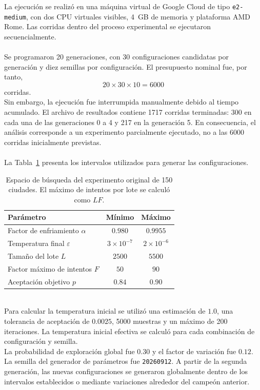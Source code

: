 \documentclass[12pt]{article}
\begin{document}
La ejecución se realizó en una máquina virtual de Google Cloud de tipo \texttt{e2-medium}, con dos CPU virtuales visibles, 4~GB de memoria y plataforma AMD Rome. Las corridas dentro del proceso experimental se
ejecutaron secuencialmente.
\\\\
Se programaron 20 generaciones, con 30 configuraciones candidatas por
generación y diez semillas por configuración. El presupuesto nominal
fue, por tanto,
\[
    20 \times 30 \times 10 = 6000
\]
corridas.
\\
Sin embargo, la ejecución fue interrumpida manualmente debido al tiempo
acumulado. El archivo de resultados contiene 1717 corridas terminadas:
300 en cada una de las generaciones 0 a 4 y 217 en la generación 5.
En consecuencia, el análisis corresponde a un experimento parcialmente
ejecutado, no a las 6000 corridas inicialmente previstas.
\\\\
La Tabla~\ref{tab:diseno150-rangos} presenta los intervalos utilizados
para generar las configuraciones.
\begin{table}[htbp]
    \centering
    \small
    \begin{tabular}{lcc}
        \hline
        Parámetro & Mínimo & Máximo \\
        \hline
        Factor de enfriamiento $\alpha$
            & $0.980$ & $0.9955$ \\
        Temperatura final $\varepsilon$
            & $3\times10^{-7}$ & $2\times10^{-6}$ \\
        Tamaño del lote $L$
            & $2500$ & $5500$ \\
        Factor máximo de intentos $F$
            & $50$ & $90$ \\
        Aceptación objetivo $p$
            & $0.84$ & $0.90$ \\
        \hline
    \end{tabular}
    \caption{Espacio de búsqueda del experimento original
    de 150 ciudades. El máximo de intentos por lote se calculó
    como $L F$.}
    \label{tab:diseno150-rangos}
\end{table}
\\
Para calcular la temperatura inicial se utilizó una estimación de
$1.0$, una tolerancia de aceptación de $0.0025$, 5000 muestras y
un máximo de 200 iteraciones. La temperatura inicial efectiva se
calculó para cada combinación de configuración y semilla.
\\
La probabilidad de exploración global fue $0.30$ y el factor de
variación fue $0.12$. La semilla del generador de parámetros fue
\texttt{20260912}. A partir de la segunda generación, las nuevas
configuraciones se generaron globalmente dentro de los intervalos
establecidos o mediante variaciones alrededor del campeón anterior.
\end{document}
